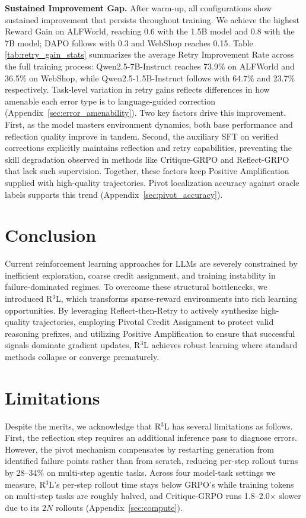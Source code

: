 \documentclass[11pt]{article}
\theoremstyle{definition}
\theoremstyle{remark}
\begin{document}
\textbf{Sustained Improvement Gap.} After warm-up, all configurations show sustained improvement that persists throughout training. We achieve the highest Reward Gain on ALFWorld, reaching 0.6 with the 1.5B model and 0.8 with the 7B model; DAPO follows with 0.3 and WebShop reaches 0.15. Table \ref{tab:retry_gain_stats} summarizes the average Retry Improvement Rate across the full training process: Qwen2.5-7B-Instruct reaches 73.9\% on ALFWorld and 36.5\% on WebShop, while Qwen2.5-1.5B-Instruct follows with 64.7\% and 23.7\% respectively. Task-level variation in retry gains reflects differences in how amenable each error type is to language-guided correction (Appendix~\ref{sec:error_amenability}).
Two key factors drive this improvement. First, as the model masters environment dynamics, both base performance and reflection quality improve in tandem. Second, the auxiliary SFT on verified corrections explicitly maintains reflection and retry capabilities, preventing the skill degradation observed in methods like Critique-GRPO and Reflect-GRPO that lack such supervision. Together, these factors keep Positive Amplification supplied with high-quality trajectories. Pivot localization accuracy against oracle labels supports this trend (Appendix~\ref{sec:pivot_accuracy}).

\section{Conclusion}
Current reinforcement learning approaches for LLMs are severely constrained by inefficient exploration, coarse credit assignment, and training instability in failure-dominated regimes. To overcome these structural bottlenecks, we introduced R$^3$L, which transforms sparse-reward environments into rich learning opportunities. By leveraging Reflect-then-Retry to actively synthesize high-quality trajectories, employing Pivotal Credit Assignment to protect valid reasoning prefixes, and utilizing Positive Amplification to ensure that successful signals dominate gradient updates, R$^3$L achieves robust learning where standard methods collapse or converge prematurely.

\section*{Limitations}
Despite the merits, we acknowledge that R$^3$L has several limitations as follows. First, the reflection step requires an additional inference pass to diagnose errors. However, the pivot mechanism compensates by restarting generation from identified failure points rather than from scratch, reducing per-step rollout turns by 28--34\% on multi-step agentic tasks. Across four model-task settings we measure, R$^3$L's per-step rollout time stays below GRPO's while training tokens on multi-step tasks are roughly halved, and Critique-GRPO runs 1.8--2.0$\times$ slower due to its $2N$ rollouts (Appendix~\ref{sec:compute}).
\end{document}
